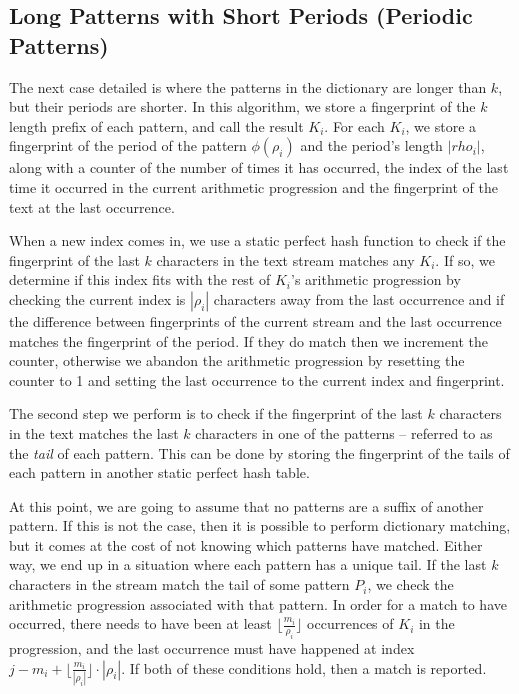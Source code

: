 \documentclass[ %
                    author={Dominic Joseph Moylett},
                    degree={MEng},
                     title={Dictionary Matching with Fingerprints},
                  subtitle={An Empirical Analysis},
                      type={research},
                      year={2015} ]{dissertation}
\begin{document}
\subsection{Long Patterns with Short Periods (Periodic Patterns)}
\label{ssec:periodic-theory}

The next case detailed is where the patterns in the dictionary are longer than $k$, but their periods are shorter. In this algorithm, we store a fingerprint of the $k$ length prefix of each pattern, and call the result $K_i$. For each $K_i$, we store a fingerprint of the period of the pattern $\phi(\rho_i)$ and the period's length $|rho_i|$, along with a counter of the number of times it has occurred, the index of the last time it occurred in the current arithmetic progression and the fingerprint of the text at the last occurrence.

When a new index comes in, we use a static perfect hash function to check if the fingerprint of the last $k$ characters in the text stream matches any $K_i$. If so, we determine if this index fits with the rest of $K_i$'s arithmetic progression by checking the current index is $|\rho_i|$ characters away from the last occurrence and if the difference between fingerprints of the current stream and the last occurrence matches the fingerprint of the period. If they do match then we increment the counter, otherwise we abandon the arithmetic progression by resetting the counter to 1 and setting the last occurrence to the current index and fingerprint.

The second step we perform is to check if the fingerprint of the last $k$ characters in the text matches the last $k$ characters in one of the patterns  --  referred to as the \textit{tail} of each pattern. This can be done by storing the fingerprint of the tails of each pattern in another static perfect hash table.

At this point, we are going to assume that no patterns are a suffix of another pattern. If this is not the case, then it is possible to perform dictionary matching, but it comes at the cost of not knowing which patterns have matched. Either way, we end up in a situation where each pattern has a unique tail. If the last $k$ characters in the stream match the tail of some pattern $P_i$, we check the arithmetic progression associated with that pattern. In order for a match to have occurred, there needs to have been at least $\lfloor\frac{m_i}{\rho_i}\rfloor$ occurrences of $K_i$ in the progression, and the last occurrence must have happened at index $j - m_i + \lfloor\frac{m_i}{|\rho_i|}\rfloor\cdot|\rho_i|$. If both of these conditions hold, then a match is reported.
\end{document}
